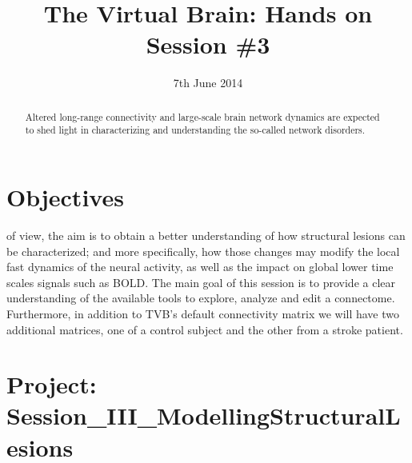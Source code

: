 \documentclass{tufte-handout}
\title{The Virtual Brain: Hands on Session \#3}
\date{7th June 2014}
\begin{document}

\newpage
\ClearWallPaper
\begin{abstract}
\noindent  Altered long-range connectivity and large-scale brain network dynamics are expected to shed light in characterizing and understanding the so-called network disorders. 
\begin{marginfigure}%
  \label{fig:marginfig}
\end{marginfigure}
\end{abstract}


\section{Objectives}\label{sec:objectives}

 of view, the aim is to obtain a better understanding of
how structural lesions can be characterized; and more specifically, how those
changes may modify the local fast dynamics of the neural activity, as well
as the impact on global lower time scales signals such as BOLD. The main goal of this
session is to provide a clear understanding of the available tools to explore, analyze and edit
a connectome. Furthermore, in addition to TVB's default connectivity matrix we will have two additional matrices, one of a control subject and the other from a stroke
patient.

\section{Project: Session\_III\_ModellingStructuralLesions}\label{sec:project_data}
\end{document}
